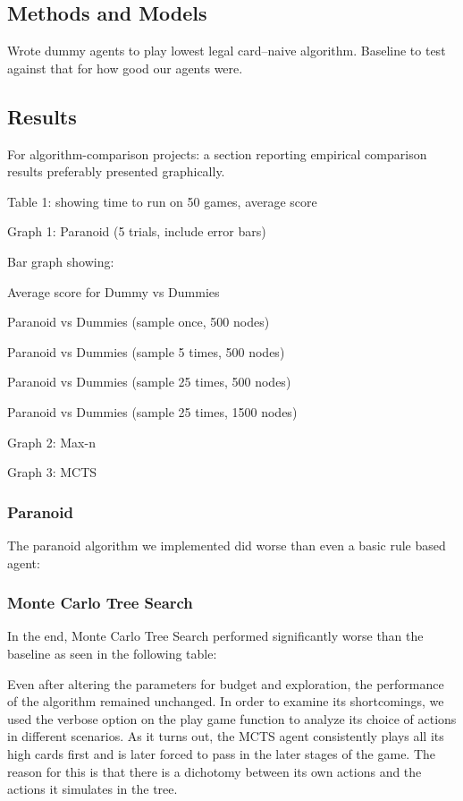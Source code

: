 \documentclass[11pt]{article}
\begin{document}
\subsection{Methods and Models}

Wrote dummy agents to play lowest legal card--naive algorithm. Baseline to test against that for how good our agents were.

\subsection{Results}

 For algorithm-comparison projects: a section reporting empirical comparison results preferably presented graphically.

Table 1: showing time to run on 50 games, average score

Graph 1: Paranoid (5 trials, include error bars)

Bar graph showing: 

Average score for Dummy vs Dummies

Paranoid vs Dummies (sample once, 500 nodes)

Paranoid vs Dummies (sample 5 times, 500 nodes)

Paranoid vs Dummies (sample 25 times, 500 nodes)

Paranoid vs Dummies (sample 25 times, 1500 nodes)

Graph 2: Max-n

Graph 3: MCTS
\subsubsection{Paranoid}

The paranoid algorithm we implemented did worse than even a basic rule based agent:



\subsubsection{Monte Carlo Tree Search}

In the end, Monte Carlo Tree Search performed significantly worse than the baseline as seen in the following table:


Even after altering the parameters for budget and exploration, the performance of the algorithm remained unchanged. In order to examine its shortcomings, we used the verbose option on the play game function to analyze its choice of actions in different scenarios. As it turns out, the MCTS agent consistently plays all its high cards first and is later forced to pass in the later stages of the game. The reason for this is that there is a dichotomy between its own actions and the actions it simulates in the tree. \\
\end{document}
